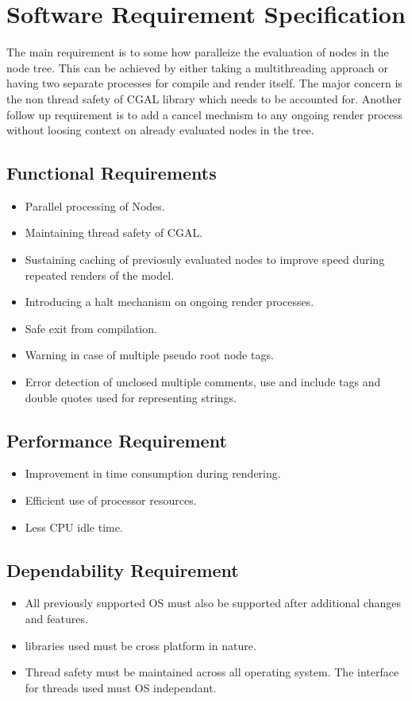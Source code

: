 \section{Software Requirement Specification}
The main requirement is to some how paralleize the evaluation of nodes in the node tree. This can be achieved by either taking a multithreading approach or having two separate processes for compile and render itself. The major concern is the non thread safety of CGAL library which needs to be accounted for.
Another follow up requirement is to add a cancel mechnism to any ongoing render process without loosing context on already evaluated nodes in the tree.

\subsection{Functional Requirements}
\begin{itemize}
	\item Parallel processing of Nodes.
	\item Maintaining thread safety of CGAL.
	\item Sustaining caching of previosuly evaluated nodes to improve speed during repeated renders of the model.
	\item Introducing a halt mechanism on ongoing render processes.
	\item Safe exit from compilation.
	\item Warning in case of multiple pseudo root node tags.
	\item Error detection of unclosed multiple comments, use and include tags and double quotes used for representing strings.
\end{itemize}

\subsection{Performance Requirement}
\begin{itemize}
	\item Improvement in time consumption during rendering.
	\item Efficient use of processor resources.
	\item Less CPU idle time.
\end{itemize}

\subsection{Dependability Requirement}
\begin{itemize}
	\item All previously supported OS must also be supported after additional changes and features.
	\item libraries used must be cross platform in nature.
	\item Thread safety must be maintained across all operating system. The interface for threads used must OS independant.
\end{itemize}
